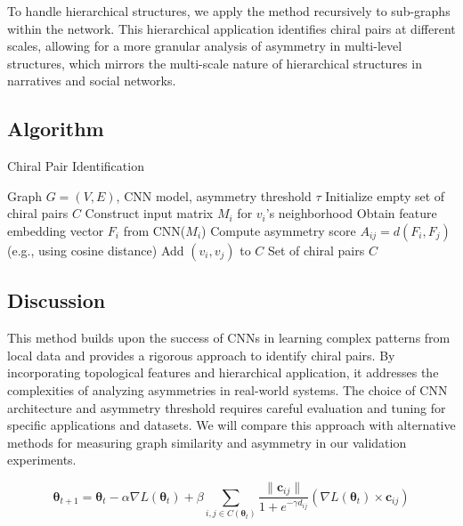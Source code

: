 \documentclass[12pt, a4paper]{article}
\begin{document}
To handle hierarchical structures, we apply the method recursively to sub-graphs within the network. This hierarchical application identifies chiral pairs at different scales, allowing for a more granular analysis of asymmetry in multi-level structures, which mirrors the multi-scale nature of hierarchical structures in narratives and social networks.


\subsection{Algorithm}


\begin{algorithm}[H]
\caption{Chiral Pair Identification}
\begin{algorithmic}[1]
\Require Graph $G=(V,E)$, CNN model, asymmetry threshold $\tau$
\State Initialize empty set of chiral pairs $C$
    \State Construct input matrix $M_i$ for $v_i$'s neighborhood
    \State Obtain feature embedding vector $F_i$ from CNN($M_i$)
\EndFor
{}
    \State Compute asymmetry score $A_{ij} = d(F_i, F_j)$ (e.g., using cosine distance)
        \State Add $(v_i, v_j)$ to $C$
    \EndIf
\EndFor
\State \Return Set of chiral pairs $C$
\end{algorithmic}
\end{algorithm}


\subsection{Discussion}

This method builds upon the success of CNNs in learning complex patterns from local data and provides a rigorous approach to identify chiral pairs.  By incorporating topological features and hierarchical application, it addresses the complexities of analyzing asymmetries in real-world systems.  The choice of CNN architecture and asymmetry threshold requires careful evaluation and tuning for specific applications and datasets.  We will compare this approach with alternative methods for measuring graph similarity and asymmetry in our validation experiments.

 



\begin{equation} \label{eq:cgd_sigmoid_final}
\boldsymbol{\theta}_{t+1} = \boldsymbol{\theta}_t - \alpha \nabla L(\boldsymbol{\theta}_t) + \beta \sum_{i,j \in C(\boldsymbol{\theta}_t)}  \frac{\| \mathbf{c}_{ij} \|}{1 + e^{-\gamma d_{ij}}} (\nabla L(\boldsymbol{\theta}_t) \times \mathbf{c}_{ij})
\end{equation}
\end{document}
